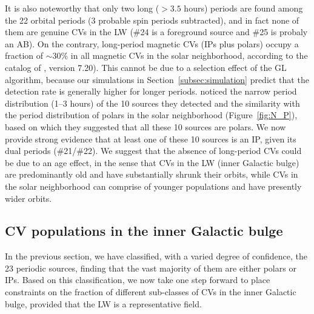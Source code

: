 \documentclass[fleqn,usenatbib]{mnras}
\begin{document}
It is also noteworthy that only two long ($>3.5$ hours) periods are found among the 22 orbital periods (3 probable spin periods subtracted), and in fact none of them are genuine CVs in the LW (\#24 is a foreground source and \#25 is probaly an AB).
On the contrary, long-period magnetic CVs (IPs plus polars) occupy a fraction of $\sim$30\% in all magnetic CVs in the solar neighborhood, according to the catalog of \citealp{2003A&A...404..301R}, version 7.20). 
This cannot be due to a selection effect of the GL algorithm, because our simulations in Section~\ref{subsec:simulation} predict that the detection rate is generally higher for longer periods.
\cite{2012ApJ...746..165H} noticed the narrow period distribution (1--3 hours) of the 10 sources they detected and the similarity with the period distribution of polars in the solar neighborhood (Figure~\ref{fig:N_P}), based on which they suggested that all these 10 sources are polars. 
We now provide strong evidence that at least one of these 10 sources is an IP, given its dual periods (\#21/\#22).
We suggest that the absence of long-period CVs could be due to an age effect, in the sense that CVs in the LW (inner Galactic bulge) are predominantly old and have substantially shrunk their orbits, while CVs in the solar neighborhood can comprise of younger populations and have presently wider orbits.  

\subsection{CV populations in the inner Galactic bulge}\label{subsec:population}
In the previous section, we have classified, with a varied degree of confidence, the 23 periodic sources, finding that the vast majority of them are either polars or IPs. Based on this classification, we now take one step forward to place constraints on the fraction of different sub-classes of CVs in the inner Galactic bulge, provided that the LW is a representative field. 
\end{document}
